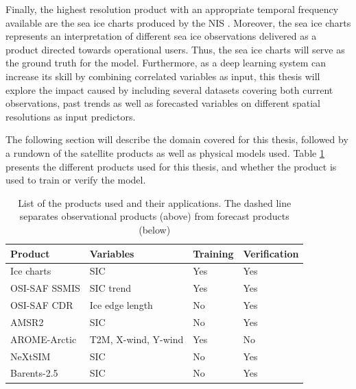 \documentclass[../main/thesis.tex]{subfiles}
\begin{document}
Finally, the highest resolution product with an appropriate temporal frequency available are the sea ice charts produced by the NIS \citep{Dinessen2020}. Moreover, the sea ice charts represents an interpretation of different sea ice observations delivered as a product directed towards operational users. Thus, the sea ice charts will serve as the ground truth for the model. Furthermore, as a deep learning system can increase its skill by combining correlated variables as input, this thesis will explore the impact caused by including several datasets covering both current observations, past trends as well as forecasted variables on different spatial resolutions as input predictors.

The following section will describe the domain covered for this thesis, followed by a rundown of the satellite products as well as physical models used. Table \ref{tab:data_overview} presents the different products used for this thesis, and whether the product is used to train or verify the model.

\begin{table}[]
    \caption{\label{tab:data_overview}List of the products used and their applications. The dashed line separates observational products (above) from forecast products (below)}
    \centering
    \setlength{\arrayrulewidth}{0.5mm}
    \renewcommand{\arraystretch}{1.3}
    \begin{tabular}{llll}
    \hline
    Product             & Variables           & Training & Verification \\
    \hline
    Ice charts          & SIC                 & Yes      & Yes          \\
    OSI-SAF SSMIS       & SIC trend           & Yes      & Yes          \\
    OSI-SAF CDR         & Ice edge length     & No       & Yes          \\
    AMSR2               & SIC                 & No       & Yes          \\
    \hdashline
    AROME-Arctic        & T2M, X-wind, Y-wind & Yes      & No           \\
    NeXtSIM             & SIC                 & No       & Yes          \\
    Barents-2.5         & SIC                 & No       & Yes          \\
    \hline         
    \end{tabular}
\end{table}
\end{document}
